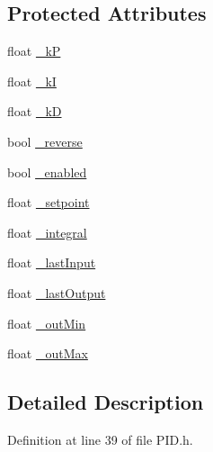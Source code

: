 \subsection*{Protected Attributes}
\begin{DoxyCompactItemize}
\item 
float \hyperlink{classflame_1_1_p_i_d_a5c5311d180b839392ee54920c3009b64}{\-\_\-k\-P}
\item 
float \hyperlink{classflame_1_1_p_i_d_aad1e934a1f8d11fd2900dc5cac926b5d}{\-\_\-k\-I}
\item 
float \hyperlink{classflame_1_1_p_i_d_a9465b06d366929164d5aa4b7e843c841}{\-\_\-k\-D}
\item 
bool \hyperlink{classflame_1_1_p_i_d_a73b97134241f384d3bd404fc946febe7}{\-\_\-reverse}
\item 
bool \hyperlink{classflame_1_1_p_i_d_ad719042f160c11b99472f17b60becded}{\-\_\-enabled}
\item 
float \hyperlink{classflame_1_1_p_i_d_ac5fe71cf9d08a3f802bab87ad6e60832}{\-\_\-setpoint}
\item 
float \hyperlink{classflame_1_1_p_i_d_a282d006056bcf192cb69ac8e48f353aa}{\-\_\-integral}
\item 
float \hyperlink{classflame_1_1_p_i_d_a3b69bca64857397d299b6f0ea3fd0be8}{\-\_\-last\-Input}
\item 
float \hyperlink{classflame_1_1_p_i_d_aa8c71b585685e773b70ece82ad7bbd26}{\-\_\-last\-Output}
\item 
float \hyperlink{classflame_1_1_p_i_d_af9be855a07fe11d4c32c542594c3466e}{\-\_\-out\-Min}
\item 
float \hyperlink{classflame_1_1_p_i_d_a573488424806f74b3b3811caf473b48a}{\-\_\-out\-Max}
\end{DoxyCompactItemize}


\subsection{Detailed Description}


Definition at line 39 of file P\-I\-D.\-h.



